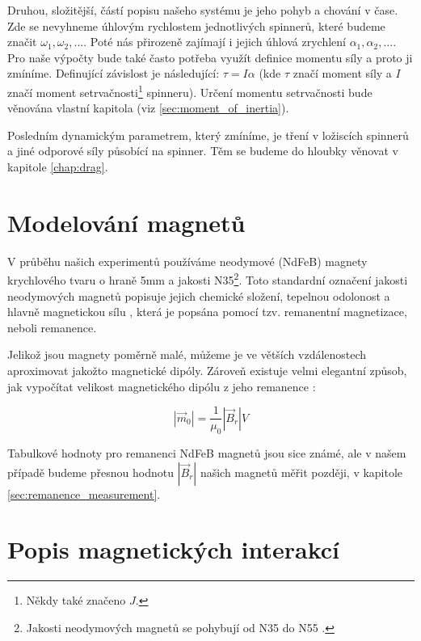 Druhou, složitější, částí popisu našeho systému je jeho pohyb a chování v čase.
Zde se nevyhneme úhlovým rychlostem jednotlivých spinnerů, které budeme značit $\omega_1, \omega_2,...$.
Poté nás přirozeně zajímají i jejich úhlová zrychlení $\alpha_1, \alpha_2, ...$. Pro naše výpočty bude také často potřeba využít definice momentu síly a proto ji zmíníme. Definující závislost je následující: $\tau = I\alpha$ (kde $\tau$ značí moment síly a $I$ značí moment setrvačnosti\footnote{Někdy také značeno $J$.} spinneru).
Určení momentu setrvačnosti bude věnována vlastní kapitola (viz \autoref{sec:moment_of_inertia}).

Posledním dynamickým parametrem, který zmíníme, je tření v ložiscích spinnerů a jiné odporové síly působící na spinner.
Těm se budeme do hloubky věnovat v kapitole \ref{chap:drag}.

\clearpage

\section{Modelování magnetů}
V průběhu našich experimentů používáme neodymové (NdFeB) magnety krychlového tvaru o hraně 5mm a jakosti N35\footnote{Jakosti neodymových magnetů se pohybují od N35 do N55 \cite{magnet_grades}.}.
Toto standardní označení jakosti neodymových magnetů popisuje jejich chemické složení, tepelnou odolonost a hlavně magnetickou sílu \cite{magnet_grades}, která je popsána pomocí tzv. remanentní magnetizace, neboli remanence.

Jelikož jsou magnety poměrně malé, můžeme je ve větších vzdálenostech aproximovat jakožto magnetické dipóly.
Zároveň existuje velmi elegantní způsob, jak vypočítat velikost magnetického dipólu z jeho remanence \cite{magnetic_torque}:

\begin{equation}
    \label{eq:mag_mom_remanence}
    |\vec{m}_0| = \frac{1}{\mu_0}|\vec{B}_r|V
\end{equation}

Tabulkové hodnoty pro remanenci NdFeB magnetů jsou sice známé, ale v našem případě budeme přesnou hodnotu $|\vec{B}_r|$ našich magnetů měřit později, v kapitole \ref{sec:remanence_measurement}.

\section{Popis magnetických interakcí}

